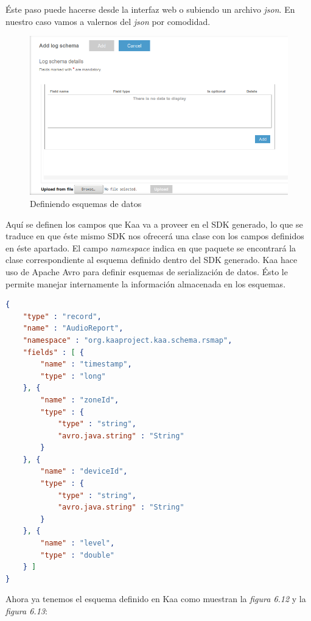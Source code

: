 Éste paso puede hacerse desde la interfaz web o subiendo un archivo \textit{json}. En nuestro caso vamos a valernos del \textit{json} por comodidad.

\begin{figure}[!ht]
  \begin{center}
    \includegraphics[scale=0.45]{../images/kaa/11-2.png}
		\caption{Definiendo esquemas de datos}
    \label{fig:kaa}
	\end{center}
\end{figure}

\newpage

Aquí se definen los campos que Kaa va a proveer en el SDK generado, lo que se traduce en que éste mismo SDK nos ofrecerá una clase con los campos definidos en éste apartado. El campo \textit{namespace} indica en que paquete se encontrará la clase correspondiente al esquema definido dentro del SDK generado. Kaa hace uso de Apache Avro para definir esquemas de serialización de datos. Ésto le permite manejar internamente la información almacenada en los esquemas.

\bigskip

\begin{lstlisting}[language=json,caption={Esquema de datos en JSON},label={lst:json_personal}]
{
	"type" : "record",
	"name" : "AudioReport",
	"namespace" : "org.kaaproject.kaa.schema.rsmap",
	"fields" : [ {
		"name" : "timestamp",
		"type" : "long"
	}, {
		"name" : "zoneId",
		"type" : {
			"type" : "string",
			"avro.java.string" : "String"
		}
	}, {
		"name" : "deviceId",
		"type" : {
			"type" : "string",
			"avro.java.string" : "String"
		}
	}, {
		"name" : "level",
		"type" : "double"
	} ]
}
\end{lstlisting}

Ahora ya tenemos el esquema definido en Kaa como muestran la \textit{figura 6.12} y la \textit{figura 6.13}:

